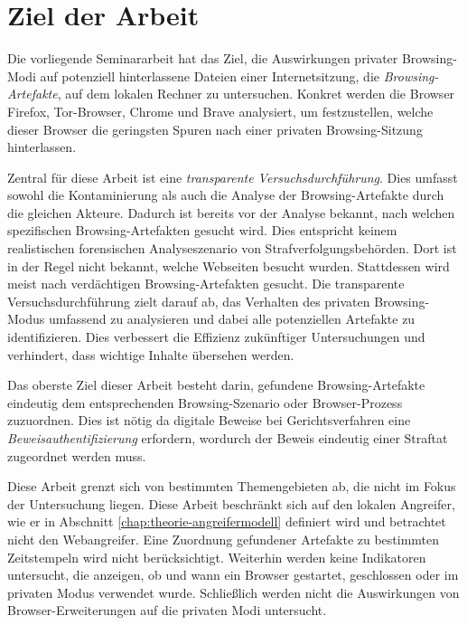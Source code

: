 \chapter{Ziel der Arbeit}
Die vorliegende Seminararbeit hat das Ziel, die Auswirkungen privater Browsing-Modi auf potenziell hinterlassene Dateien einer Internetsitzung, die \textit{Browsing-Artefakte}, auf dem lokalen Rechner zu untersuchen. Konkret werden die Browser Firefox, Tor-Browser, Chrome und Brave analysiert, um festzustellen, welche dieser Browser die geringsten Spuren nach einer privaten Browsing-Sitzung hinterlassen.

Zentral für diese Arbeit ist eine \textit{transparente Versuchsdurchführung}. Dies umfasst sowohl die Kontaminierung als auch die Analyse der Browsing-Artefakte durch die gleichen Akteure. Dadurch ist bereits vor der Analyse bekannt, nach welchen spezifischen Browsing-Artefakten gesucht wird. Dies entspricht keinem realistischen forensischen Analyseszenario von Strafverfolgungsbehörden. Dort ist in der Regel nicht bekannt, welche Webseiten besucht wurden. Stattdessen wird meist nach verdächtigen Browsing-Artefakten gesucht.
Die transparente Versuchsdurchführung zielt darauf ab, das Verhalten des privaten Browsing-Modus umfassend zu analysieren und dabei alle potenziellen Artefakte zu identifizieren. Dies verbessert die Effizienz zukünftiger Untersuchungen und verhindert, dass wichtige Inhalte übersehen werden. \cite{Horsman.2019}

Das oberste Ziel dieser Arbeit besteht darin, gefundene Browsing-Artefakte eindeutig dem entsprechenden Browsing-Szenario oder Browser-Prozess zuzuordnen. 
Dies ist nötig da digitale Beweise bei Gerichtsverfahren eine \textit{Beweisauthentifizierung} erfordern, wordurch der Beweis eindeutig einer Straftat zugeordnet werden muss.

Diese Arbeit grenzt sich von bestimmten Themengebieten ab, die nicht im Fokus der Untersuchung liegen. Diese Arbeit beschränkt sich auf den lokalen Angreifer, wie er in Abschnitt \ref{chap:theorie-angreifermodell} definiert wird und betrachtet nicht den Webangreifer. Eine Zuordnung gefundener Artefakte zu bestimmten Zeitstempeln wird nicht berücksichtigt. 
Weiterhin werden keine Indikatoren untersucht, die anzeigen, ob und wann ein Browser gestartet, geschlossen oder im privaten Modus verwendet wurde.
Schließlich werden nicht die Auswirkungen von Browser-Erweiterungen auf die privaten Modi untersucht.


